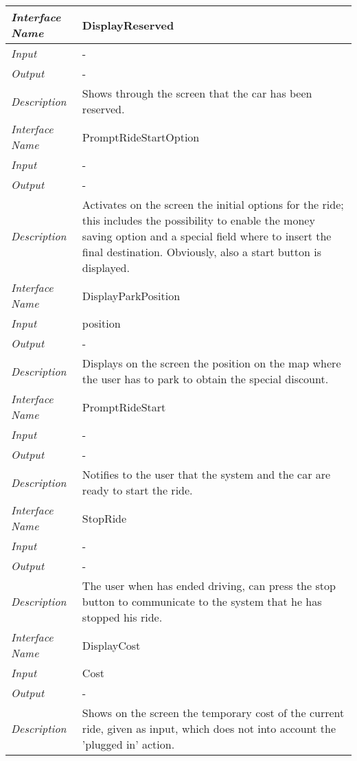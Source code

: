 \documentclass[11pt,a4paper]{report}
\begin{document}
	\begin{tabularx}{\textwidth}{|>{\em}l|X|}
		\hline
		Interface Name& DisplayReserved\\
		\hline
		Input & -\\
		\hline
		Output & -\\
		\hline
		Description & Shows through the screen that the car has been reserved.\\
		\hline
		\hline
		Interface Name& PromptRideStartOption\\
		\hline
		Input & -\\
		\hline
		Output & -\\
		\hline
		Description &Activates on the screen the initial options for the ride; this includes the possibility to enable the money saving option and a special field where to insert the final destination. Obviously, also a start button is displayed.\\
		\hline
		\hline
		Interface Name& DisplayParkPosition\\
		\hline
		Input & position\\
		\hline
		Output & -\\
		\hline
		Description &Displays on the screen the position on the map where the user has to park to obtain the special discount.\\
		\hline
		\hline
		Interface Name& PromptRideStart\\
		\hline
		Input & -\\
		\hline
		Output & -\\
		\hline
		Description &Notifies to the user that the system and the car are ready to start the ride.\\
		\hline
		\hline
		Interface Name& StopRide\\
		\hline
		Input & -\\
		\hline
		Output & -\\
		\hline
		Description &The user when has ended driving, can press the stop button to communicate to the system that he has stopped his ride.\\
		\hline
		\hline
		Interface Name& DisplayCost\\
		\hline
		Input & Cost\\
		\hline
		Output & -\\
		\hline
		Description &Shows on the screen the temporary cost of the current ride, given as input, which does not into account the 'plugged in' action. \\
		\hline
	\end{tabularx}
\end{document}

